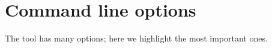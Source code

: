 %
%
%
%
%
%

\section{Command line options}

The tool has many options; here we highlight the most important ones.

